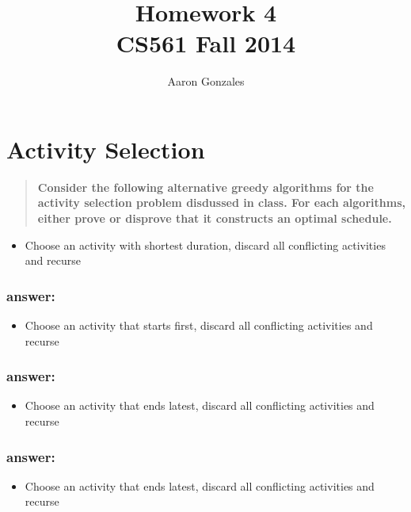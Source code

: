 \documentclass[titlepage]{article}\usepackage[]{graphicx}\usepackage[]{color}
\begin{document}
\title{Homework 4 \\ CS561 Fall 2014}
\author{Aaron Gonzales}
\maketitle


\section{Activity Selection}
\begin{quote}
  \textbf{ Consider the following alternative greedy algorithms for the
	activity selection problem disdussed in class. For each algorithms, either
  prove or disprove that it constructs an optimal schedule. }
\end{quote}

\begin{itemize}
  \item Choose an activity with shortest duration, discard all
	conflicting activities and recurse
\end{itemize}
\subsubsection{answer:}
\vspace{7 cm}

\begin{itemize}
  \item Choose an activity that starts first, discard all conflicting
	activities and recurse
\end{itemize}
\subsubsection{answer:}
\vspace{9 cm}

\begin{itemize}
  \item Choose an activity that ends latest, discard all conflicting
	activities and recurse
\end{itemize}
\subsubsection{answer:}
\vspace{7 cm}

\begin{itemize}
  \item Choose an activity that ends latest, discard all
	conflicting activities and recurse
\end{itemize}
\end{document}
